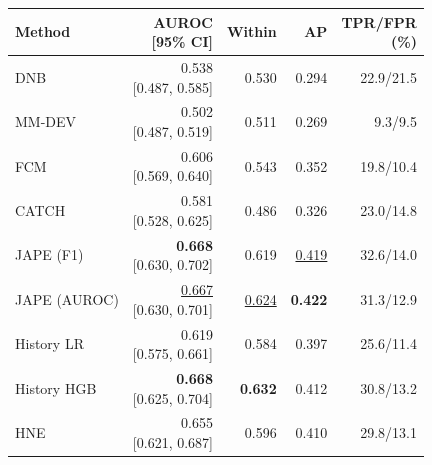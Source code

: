 \begin{tabular*}{\linewidth}{@{\extracolsep{\fill}}lrrrr@{}}
\toprule
Method & \shortstack{AUROC\\{}[95\% CI]} & Within & AP & \shortstack{TPR/FPR\\(\%)} \\
\midrule
DNB & \shortstack[r]{0.538 \\ {}[0.487, 0.585]} & 0.530 & 0.294 & 22.9/21.5 \\
MM-DEV & \shortstack[r]{0.502 \\ {}[0.487, 0.519]} & 0.511 & 0.269 & 9.3/9.5 \\
FCM & \shortstack[r]{0.606 \\ {}[0.569, 0.640]} & 0.543 & 0.352 & 19.8/10.4 \\
CATCH & \shortstack[r]{0.581 \\ {}[0.528, 0.625]} & 0.486 & 0.326 & 23.0/14.8 \\
JAPE (F1) & \shortstack[r]{\textbf{0.668} \\ {}[0.630, 0.702]} & 0.619 & \underline{0.419} & 32.6/14.0 \\
JAPE (AUROC) & \shortstack[r]{\underline{0.667} \\ {}[0.630, 0.701]} & \underline{0.624} & \textbf{0.422} & 31.3/12.9 \\
History LR & \shortstack[r]{0.619 \\ {}[0.575, 0.661]} & 0.584 & 0.397 & 25.6/11.4 \\
History HGB & \shortstack[r]{\textbf{0.668} \\ {}[0.625, 0.704]} & \textbf{0.632} & 0.412 & 30.8/13.2 \\
\cellcolor{hnegray}HNE & \shortstack[r]{0.655 \\ {}[0.621, 0.687]} & 0.596 & 0.410 & 29.8/13.1 \\
\bottomrule
\end{tabular*}